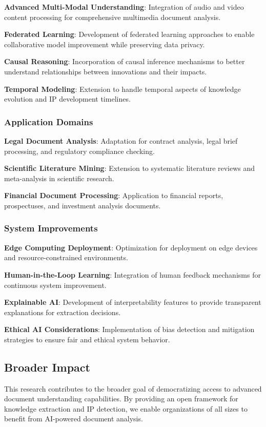\documentclass[11pt,a4paper]{article}
\begin{document}
\textbf{Advanced Multi-Modal Understanding}: Integration of audio and video content processing for comprehensive multimedia document analysis.

\textbf{Federated Learning}: Development of federated learning approaches to enable collaborative model improvement while preserving data privacy.

\textbf{Causal Reasoning}: Incorporation of causal inference mechanisms to better understand relationships between innovations and their impacts.

\textbf{Temporal Modeling}: Extension to handle temporal aspects of knowledge evolution and IP development timelines.

\subsubsection{Application Domains}

\textbf{Legal Document Analysis}: Adaptation for contract analysis, legal brief processing, and regulatory compliance checking.

\textbf{Scientific Literature Mining}: Extension to systematic literature reviews and meta-analysis in scientific research.

\textbf{Financial Document Processing}: Application to financial reports, prospectuses, and investment analysis documents.

\subsubsection{System Improvements}

\textbf{Edge Computing Deployment}: Optimization for deployment on edge devices and resource-constrained environments.

\textbf{Human-in-the-Loop Learning}: Integration of human feedback mechanisms for continuous system improvement.

\textbf{Explainable AI}: Development of interpretability features to provide transparent explanations for extraction decisions.

\textbf{Ethical AI Considerations}: Implementation of bias detection and mitigation strategies to ensure fair and ethical system behavior.

\subsection{Broader Impact}

This research contributes to the broader goal of democratizing access to advanced document understanding capabilities. By providing an open framework for knowledge extraction and IP detection, we enable organizations of all sizes to benefit from AI-powered document analysis.
\end{document}
